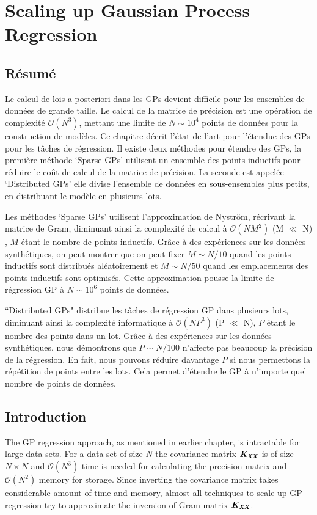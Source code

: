 \chapter{Scaling up Gaussian Process Regression}
\label{chapScalingGPR}


\begin{mdframed}[hidealllines=true,backgroundcolor=lightgray!20]
\section*{Résumé}
Le calcul de lois a posteriori dans les GPs devient difficile pour les ensembles de données de grande taille. Le calcul de la matrice de précision est une opération de complexité $ \mathcal{O}(N ^ {3}) $, mettant une limite de $ N \sim 10^4 $ points de données pour la construction de modèles. Ce chapitre décrit l'état de l'art pour l'étendue des GPs pour les tâches de régression. Il existe deux méthodes pour étendre des GPs, la première méthode `Sparse GPs' utilisent un ensemble des points inductifs pour réduire le coût de calcul de la matrice de précision. La seconde est appelée `Distributed GPs' elle divise l'ensemble de données en sous-ensembles plus petits, en distribuant le modèle en plusieurs lots.

Les méthodes `Sparse GPs' utilisent l'approximation de Nystr\"{o}m, récrivant la matrice de Gram, diminuant ainsi la complexité de calcul à $ \mathcal{O} (NM^{2}) $ (M $ \ll $ N) , $ M $ étant le nombre de points inductifs. Grâce à des expériences sur les données synthétiques, on peut montrer que on peut fixer $ M \sim N/10 $ quand les points inductifs sont distribués aléatoirement et $ M \sim N/50 $ quand les emplacements des points inductifs sont optimisés. Cette approximation pousse la limite de régression GP à $ N \sim 10^6 $ points de données.

``Distributed GPs" distribue les tâches de régression GP dans plusieurs lots, diminuant ainsi la complexité informatique à $ \mathcal{O} (NP^{3}) $ (P $\ll$ N), $ P $ étant le nombre des points dans un lot. Grâce à des expériences sur les données synthétiques, nous démontrons que $ P \sim N/100 $ n'affecte pas beaucoup la précision de la régression. En fait, nous pouvons réduire davantage $ P $ si nous permettons la répétition de points entre les lots. Cela permet d'étendre le GP à n'importe quel nombre de points de données.
\end{mdframed}



\section{Introduction}
The GP regression approach, as mentioned in earlier chapter, is intractable for large data-sets. For a data-set of size $N$ the covariance matrix $\bm{\mathit{K_{XX}}}$ is of size $N \times N$ and $\mathcal{O}\left ( N^{3} \right )$ time is needed for calculating the precision matrix and $\mathcal{O}\left ( N^{2} \right )$ memory for storage. Since inverting the covariance matrix takes considerable amount of time and memory, almost all techniques to scale up GP regression try to approximate the inversion of Gram matrix $\bm{\mathit{K_{XX}}}$. 

